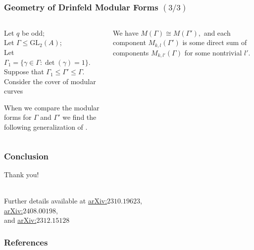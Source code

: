 \documentclass[handout]{beamer}
\numberwithin{equation}{section}
\numberwithin{case}{theorem}
\newcommand{\sX}{\mathscr{X}}		%
\newcommand{\GL}{\mathrm{GL}} 	%
\newcommand{\<}{\left\langle}
\renewcommand{\>}{\right\rangle}
\begin{document}
	\begin{frame}
		\frametitle{Geometry of Drinfeld Modular Forms $(3/3)$}
		\begin{columns} 
			\begin{column}{.5\textwidth}
				Let $q$ be odd;\\
				Let $\Gamma\leq \GL_2(A)$;\\ 
				Let $\Gamma_1=\{\gamma\in \Gamma:\det(\gamma)=1\}.$\\
				Suppose that $\Gamma_1\leq \Gamma'\leq \Gamma.$ \pause \\
				Consider the cover of modular curves
				\begin{figure}[!h]\centering
				\end{figure}\pause
				When we compare the modular forms for $\Gamma$ and $\Gamma'$ we find the following generalization of \cite[Theorem $6.2$]{Franklin-geometry-Drinfeld-modular-forms}.
			\end{column}\pause
			\begin{column}{.5\textwidth}
				\begin{theorem}
					We have $M(\Gamma)\cong M(\Gamma'),$ \pause
					and each component $M_{k,l}(\Gamma')$ is some direct sum of components $M_{k,l'}(\Gamma)$ for some nontrivial $l'.$
				\end{theorem}
			\end{column}
		\end{columns}	
	\end{frame}
	
	\begin{frame}
		\frametitle{Conclusion}
		\centering
		Thank you!\\ \pause 
		
		$~$\\
		
		Further details available at \href{https://arxiv.org/abs/2310.19623}{arXiv:$2310.19623$},\\
		
		\href{https://arxiv.org/abs/2408.00198}{arXiv:$2408.00198$},\\
		
		and \href{https://arxiv.org/abs/2312.15128}{arXiv:$2312.15128$}
	\end{frame}
	
	\begin{frame}[allowframebreaks]
		\frametitle{References}
		
		
	\end{frame}
	
	
\end{document}
